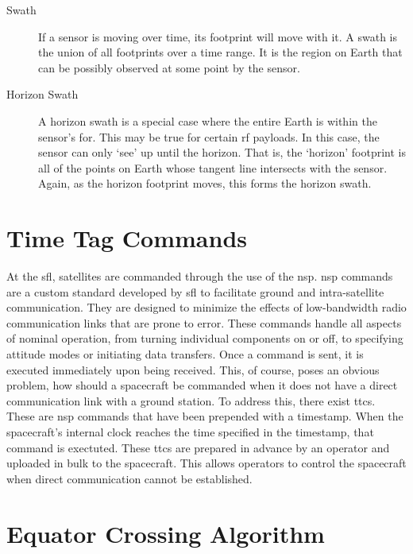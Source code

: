 \begin{description}
    \item[Swath] If a sensor is moving over time, its footprint will move with
	it. A swath is the union of all footprints over a time range.  It is
	the region on Earth that can be possibly observed at some point by the
	sensor.

    \item[Horizon Swath] A horizon swath is a special case where the entire
	Earth is within the sensor's \gls{for}. This may be true for certain
	\gls{rf} payloads. In this case, the sensor can only `see' up until the
	horizon. That is, the `horizon' footprint is all of the points on Earth
	whose tangent line intersects with the sensor. Again, as the horizon
	footprint moves, this forms the horizon swath.

\end{description}



\section{Time Tag Commands}

At the \gls{sfl}, satellites are commanded through the use of the \gls{nsp}.
\gls{nsp} commands are a custom standard developed by \gls{sfl} to facilitate
ground and intra-satellite communication. They are designed to minimize the
effects of low-bandwidth radio communication links that are prone to error.
These commands handle all aspects of nominal operation, from turning individual
components on or off, to specifying attitude modes or initiating data
transfers. Once a command is sent, it is executed immediately upon being
received. This, of course, poses an obvious problem, how should a spacecraft be
commanded when it does not have a direct communication link with a ground
station. To address this, there exist \glspl{ttc}. These are \gls{nsp} commands
that have been prepended with a timestamp. When the spacecraft's internal clock
reaches the time specified in the timestamp, that command is exectuted. These
\glspl{ttc} are prepared in advance by an operator and uploaded in bulk to the
spacecraft. This allows operators to control the spacecraft when direct
communication cannot be established.



\section{Equator Crossing Algorithm}

